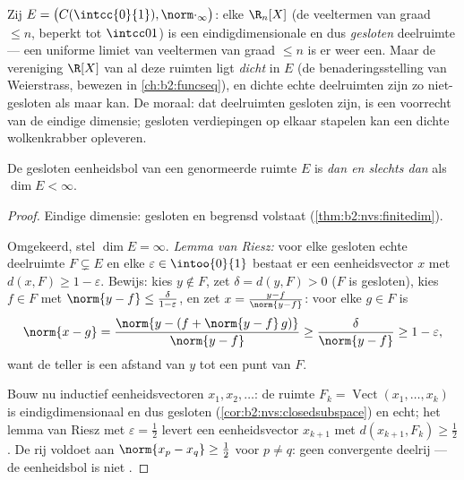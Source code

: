 \begin{example}\label{ex:b2:nvs:closeddense}
Zij $E = \bigl(C(\intcc{0}{1}), \norm\cdot_\infty\bigr)$: elke
$\R_n[X]$ (de veeltermen van graad $\leq n$, beperkt tot
$\intcc01$) is een eindigdimensionale en dus \emph{gesloten}
deelruimte --- een uniforme limiet van veeltermen van graad $\leq
n$ is er weer een. Maar de vereniging $\R[X]$ van al deze ruimten
ligt \emph{dicht} in $E$ (de benaderingsstelling van Weierstrass,
bewezen in \cref{ch:b2:funcseq}), en dichte echte deelruimten zijn
zo niet-gesloten als maar kan. De moraal: dat deelruimten gesloten
zijn, is een voorrecht van de eindige dimensie; gesloten
verdiepingen op elkaar stapelen kan een dichte wolkenkrabber
opleveren.
\end{example}

\begin{theorem}[Riesz]\label{thm:b2:nvs:riesz}
De gesloten eenheidsbol van een genormeerde ruimte $E$ is 
\emph{dan en slechts dan} als $\dim E < \infty$.
\end{theorem}

\begin{proof}
Eindige dimensie: gesloten en begrensd volstaat
(\cref{thm:b2:nvs:finitedim}).

Omgekeerd, stel $\dim E = \infty$. \emph{Lemma van Riesz:} voor
elke gesloten echte deelruimte $F \subsetneq E$ en elke
$\varepsilon \in \intoo{0}{1}$ bestaat er een eenheidsvector $x$
met $d(x, F) \geq 1 - \varepsilon$. Bewijs: kies $y \notin F$, zet
$\delta = d(y, F) > 0$ ($F$ is gesloten), kies $f \in F$ met
$\norm{y - f} \leq \frac{\delta}{1 - \varepsilon}$, en zet $x =
\frac{y - f}{\norm{y - f}}$: voor elke $g \in F$ is
\[
\norm{x - g} = \frac{\norm{y - (f + \norm{y-f}\,g)}}{\norm{y - f}}
\geq \frac{\delta}{\norm{y-f}} \geq 1 - \varepsilon ,
\]
want de teller is een afstand van $y$ tot een punt van $F$.

Bouw nu inductief eenheidsvectoren $x_1, x_2, \dots$: de ruimte
$F_k = \operatorname{Vect}(x_1, \dots, x_k)$ is eindigdimensionaal
en dus gesloten (\cref{cor:b2:nvs:closedsubspace}) en echt; het
lemma van Riesz met $\varepsilon = \frac12$ levert een
eenheidsvector $x_{k+1}$ met $d(x_{k+1}, F_k) \geq \frac12$. De rij
voldoet aan $\norm{x_p - x_q} \geq \frac12$ voor $p \neq q$: geen
convergente deelrij --- de eenheidsbol is niet .
\end{proof}

